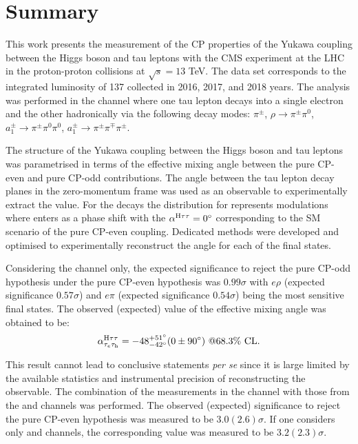 \chapter{Summary}\label{sec:outro}

This work presents the measurement of the CP properties of the Yukawa coupling between the Higgs boson and tau leptons with the CMS experiment at the LHC in the proton-proton collisions at $\sqrt{s} = 13$ TeV. The data set corresponds to the integrated luminosity of 137 \ifb collected in 2016, 2017, and 2018 years. The analysis was performed in the \et channel where one tau lepton decays into a single electron and the other hadronically via the following decay modes: $\pi^\pm$, $\rho \to \pi^\pm \pi^0$, $a_1^\pm \to \pi^\pm\pi^0\pi^0$, $a_1^\pm \to \pi^\pm \pi^\mp \pi^\pm$. 

The structure of the Yukawa coupling between the Higgs boson and tau leptons was parametrised in terms of the effective mixing angle \mixa between the pure CP-even and pure CP-odd contributions. The angle between the tau lepton decay planes in the zero-momentum frame \phicp was used as an observable to experimentally extract the \mixa value. For the \htt decays the distribution for \phicp represents modulations where \mixa enters as a phase shift with the $\alpha^{\text{H}\tau\tau}=0^\circ$ corresponding to the SM scenario of the pure CP-even coupling. Dedicated methods were developed and optimised to experimentally reconstruct the \phicp angle for each of the final states.  

Considering the \et channel only, the expected significance to reject the pure CP-odd hypothesis under the pure CP-even hypothesis was $0.99\sigma$ with $e\rho$ (expected significance $0.57\sigma$) and $e\pi$ (expected significance $0.54\sigma$) being the most sensitive final states. The observed (expected) value of the effective mixing angle was obtained to be:
\begin{equation}
    \alpha^{\text{H}\tau\tau}_{\tau_e\tau_\mathrm{h}} = -48^{+51^\circ}_{-42^\circ}(0 \pm 90^\circ) ~@68.3\% \text{ CL}.
\end{equation}

This result cannot lead to conclusive statements \textit{per se} since it is large limited by the available statistics and instrumental precision of reconstructing the \phicp observable. The combination of the measurements in the \et channel with those from the \mt and \tata channels was performed. The observed (expected) significance to reject the pure CP-even hypothesis was measured to be $3.0 (2.6)\sigma$. If one considers only \mt and \tata channels, the corresponding value was measured to be $3.2 (2.3)\sigma$. 

